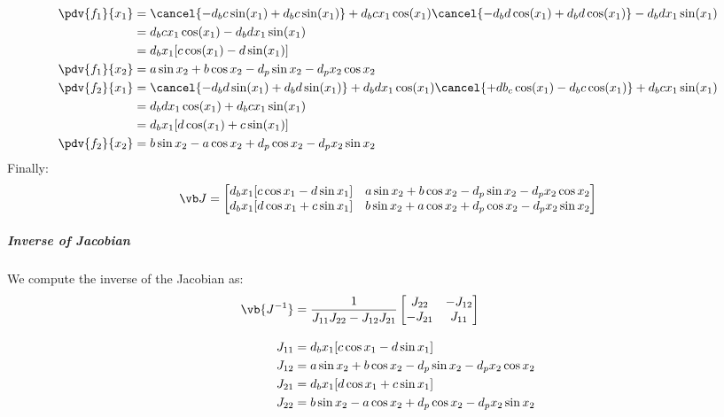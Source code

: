 \begin{subequations}
\begin{align}
    \pdv{f_1}{x_1} &= \cancel{-d_bc\sin(x_1) + d_bc\sin(x_1)} + d_bcx_1\cos(x_1) \cancel{- d_bd\cos(x_1) + d_bd\cos(x_1)} - d_bdx_1\sin(x_1)\\
        &= d_bcx_1\cos(x_1) - d_bdx_1\sin(x_1)\\
        &= d_bx_1[c\cos(x_1) - d\sin(x_1)]\\
            \pdv{f_1}{x_2} &= a\sin x_2 + b\cos x_2 - d_p \sin x_2 - d_px_2 \cos x_2 \\
            \pdv{f_2}{x_1} &= \cancel{-d_bd\sin(x_1) + d_bd\sin(x_1)} + d_bdx_1\cos(x_1) \cancel{+ db_c\cos(x_1) - d_bc\cos(x_1)} + d_bcx_1\sin(x_1)\\
        &= d_bdx_1\cos(x_1) + d_bcx_1\sin(x_1)\\
        &= d_bx_1[d\cos(x_1) + c\sin(x_1)]\\
            \pdv{f_2}{x_2} &= b\sin x_2 - a\cos x_2 + d_p\cos x_2 - d_px_2\sin x_2
\end{align}
\end{subequations}
Finally:
\begin{align}
    \vb J =
        \begin{bmatrix}
            d_bx_1[c\cos x_1 - d\sin x_1] & a\sin x_2 + b\cos x_2 - d_p \sin x_2 - d_px_2 \cos x_2\\
            d_bx_1[d\cos x_1 + c\sin x_1] & b\sin x_2+a\cos x_2 + d_p\cos x_2 - d_px_2\sin x_2 \\
        \end{bmatrix}
\end{align}

\subparagraph{Inverse of Jacobian}
We compute the inverse of the Jacobian as:
\begin{align}
    \vb {J^{-1}} &= \frac{1}{J_{11}J_{22} - J_{12}J_{21}}
        \begin{bmatrix}
            J_{22} & - J_{12} \\
            -J_{21} & J_{11}
        \end{bmatrix}\\[2ex]
    J_{11} &= d_bx_1[c\cos x_1 - d\sin x_1] \\
    J_{12} &= a\sin x_2 + b\cos x_2 - d_p \sin x_2 - d_px_2 \cos x_2  \\
    J_{21} &= d_bx_1[d\cos x_1 + c\sin x_1] \\
    J_{22} &= b\sin x_2 - a\cos x_2 + d_p\cos x_2 - d_px_2\sin x_2
\end{align}

